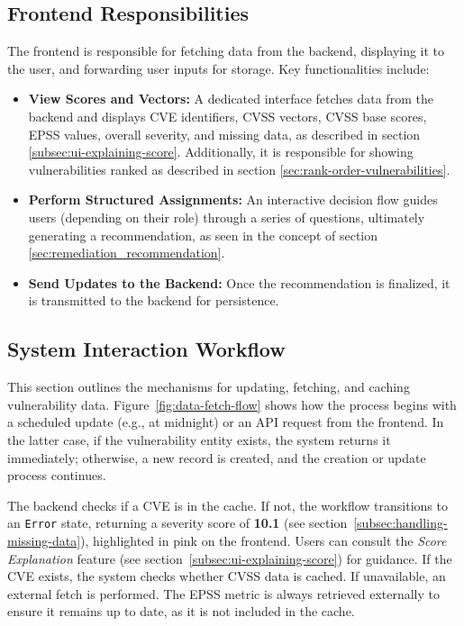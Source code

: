 \subsection{Frontend Responsibilities}
\label{subsec:frontend-responsibilities}

The frontend is responsible for fetching data from the backend, displaying it to the user, and forwarding user inputs for storage. Key functionalities include:

\begin{itemize}
  \item \textbf{View Scores and Vectors:} A dedicated interface fetches data from the backend and displays \ac{CVE} identifiers, \ac{CVSS} vectors, \ac{CVSS} base scores, \ac{EPSS} values, overall severity, and missing data, as described in section \ref{subsec:ui-explaining-score}. Additionally, it is responsible for showing vulnerabilities ranked as described in section \ref{sec:rank-order-vulnerabilities}.
  \item \textbf{Perform Structured Assignments:} An interactive decision flow guides users (depending on their role) through a series of questions, ultimately generating a recommendation, as seen in the concept of section \ref{sec:remediation_recommendation}. 
  \item \textbf{Send Updates to the Backend:} Once the recommendation is finalized, it is transmitted to the backend for persistence.
\end{itemize}


\subsection{System Interaction Workflow}
\label{subsec:system-interaction}

This section outlines the mechanisms for updating, fetching, and caching vulnerability data. Figure~\ref{fig:data-fetch-flow} shows how the process begins with a scheduled update (e.g., at midnight) or an \ac{API} request from the frontend. In the latter case, if the vulnerability entity exists, the system returns it immediately; otherwise, a new record is created, and the creation or update process continues.

The backend checks if a \ac{CVE} is in the cache. If not, the workflow transitions to an \texttt{Error} state, returning a severity score of \textbf{10.1} (see section~\ref{subsec:handling-missing-data}), highlighted in pink on the frontend. Users can consult the \emph{Score Explanation} feature (see section~\ref{subsec:ui-explaining-score}) for guidance. If the \ac{CVE} exists, the system checks whether \ac{CVSS} data is cached. If unavailable, an external fetch is performed. The \ac{EPSS} metric is always retrieved externally to ensure it remains up to date, as it is not included in the cache.

